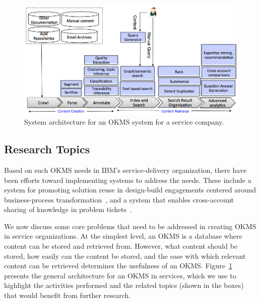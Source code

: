 \begin{figure}
	\center
	\includegraphics[scale=0.45]{figs/km.png}
        \vspace*{-10pt}
	\caption{System architecture for an OKMS system for a service company.}
        \vspace*{-10pt}
	\label{fig-km}
\end{figure}

\subsection{Research Topics}

Based on such OKMS needs in IBM's service-delivery organization, there have been
efforts toward implementing systems to address the needs. These include a system
for promoting solution reuse in design-build engagements centered around
business-process transformation~\cite{Goodwin:2012b}, and a system that enables
cross-account sharing of knowledge in problem tickets~\cite{Majumdar:2011}.

We now discuss some core problems that need to be addressed in creating OKMS in
service organizations. At the simplest level, an OKMS is a database where
content can be stored and retrieved from. However, what content should be
stored, how easily can the content be stored, and the ease with which relevant
content can be retrieved determines the usefulness of an OKMS.
Figure~\ref{fig-km} presents the general architecture for an OKMS in services,
which we use to highlight the activities performed and the related topics (shown
in the boxes) that would benefit from further research. 




